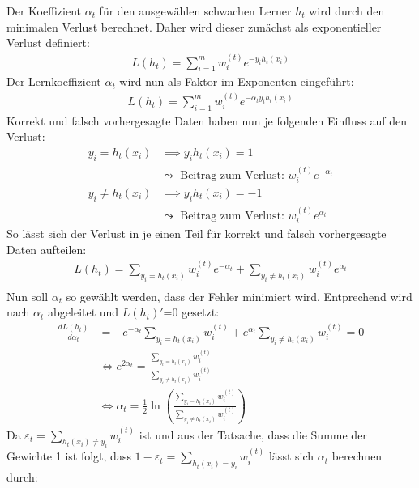 Der Koeffizient $\alpha_t$ für den ausgewählen schwachen Lerner $h_t$ wird durch den minimalen Verlust berechnet. Daher wird dieser zunächst als
exponentieller Verlust definiert:
\begin{align*}
    L(h_t) = \sum_{i=1}^{m} w_i^{(t)}e^{-y_ih_t(x_i)}
\end{align*}
Der Lernkoeffizient $\alpha_t$ wird nun als Faktor im Exponenten eingeführt:
\begin{align*}
    L(h_t)=\sum_{i=1}^{m}w_i^{(t)}e^{-\alpha_ty_ih_t(x_i)}
\end{align*}
Korrekt und falsch vorhergesagte Daten haben nun je folgenden Einfluss auf den Verlust:
\begin{align*}
    y_i = h_t(x_i)    & \implies y_ih_t(x_i)  = 1                                     \\
                      & \leadsto \text{ Beitrag zum Verlust: } w_i^{(t)}e^{-\alpha_t} \\
    y_i \neq h_t(x_i) & \implies y_ih_t(x_i)  = -1                                    \\
                      & \leadsto \text{ Beitrag zum Verlust: } w_i^{(t)}e^{\alpha_t}
\end{align*}
So lässt sich der Verlust in je einen Teil für korrekt und falsch vorhergesagte Daten aufteilen:
\begin{align*}
    L(h_t) = \sum_{y_i=h_t(x_i)}w_i^{(t)}e^{-\alpha_t} + \sum_{y_i\neq h_t(x_i)} w_i^{(t)}e^{\alpha_t} \\
\end{align*}
Nun soll $\alpha_t$ so gewählt werden, dass der Fehler minimiert wird. Entprechend wird nach $\alpha_t$ abgeleitet und $L(h_t)'$=0 gesetzt:
\begin{align*}
    \frac{dL(h_t)}{d\alpha_t} & = -e^{-\alpha_t}\sum_{y_i=h_t(x_i)}w_i^{(t)} + e^{\alpha_t}\sum_{y_i\neq h_t(x_i)}w_i^{(t)} = 0                             \\
                              & \Leftrightarrow e^{2\alpha_t} = \frac{\sum_{y_i=h_t(x_i)}w_i^{(t)}}{\sum_{y_i\neq h_t(x_i)}w_i^{(t)}}                       \\
                              & \Leftrightarrow \alpha_t = \frac{1}{2}\ln\left(\frac{\sum_{y_i=h_t(x_i)}w_i^{(t)}}{\sum_{y_i\neq h_t(x_i)}w_i^{(t)}}\right)
\end{align*}
Da $\varepsilon_t=\sum_{h_t(x_i)\neq y_i}w_i^{(t)}$ ist und aus der Tatsache, dass die Summe der Gewichte 1 ist folgt, dass $1-\varepsilon_t=\sum_{h_t(x_i)= y_i}w_i^{(t)}$ lässt
sich $\alpha_t$ berechnen durch:
